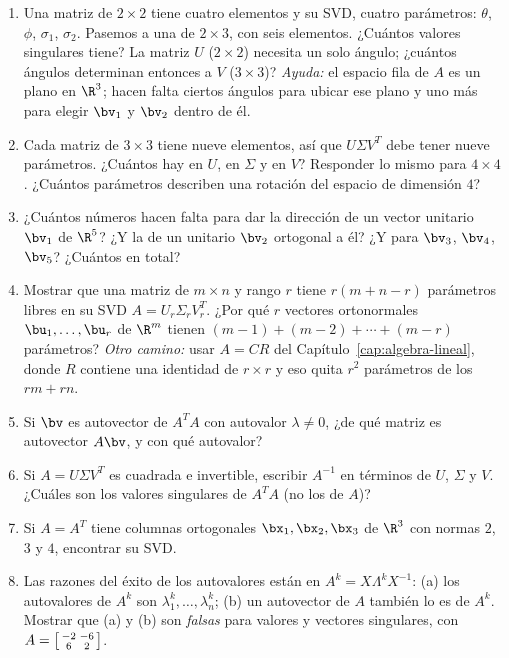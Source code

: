 \begin{enumerate}
\item\label{ej:parametros} Una matriz de $2\times2$ tiene cuatro elementos y
su SVD, cuatro parámetros: $\theta$, $\phi$, $\sigma_1$, $\sigma_2$. Pasemos
a una de $2\times3$, con seis elementos. ¿Cuántos valores singulares tiene?
La matriz $U$ ($2\times2$) necesita un solo ángulo; ¿cuántos ángulos
determinan entonces a $V$ ($3\times3$)? \emph{Ayuda:} el espacio fila de $A$
es un plano en $\R^3$; hacen falta ciertos ángulos para ubicar ese plano y
uno más para elegir $\bv_1$ y $\bv_2$ dentro de él.

\item Cada matriz de $3\times3$ tiene nueve elementos, así que
$U\Sigma V^T$ debe tener nueve parámetros. ¿Cuántos hay en $U$, en $\Sigma$ y
en $V$? Responder lo mismo para $4\times4$. ¿Cuántos parámetros describen una
rotación del espacio de dimensión $4$?

\item ¿Cuántos números hacen falta para dar la dirección de un vector
unitario $\bv_1$ de $\R^5$? ¿Y la de un unitario $\bv_2$ ortogonal a él? ¿Y
para $\bv_3$, $\bv_4$, $\bv_5$? ¿Cuántos en total?

\item Mostrar que una matriz de $m\times n$ y rango $r$ tiene
$r(m+n-r)$ parámetros libres en su SVD $A=U_r\Sigma_rV_r^T$. ¿Por qué $r$
vectores ortonormales $\bu_1,\dots,\bu_r$ de $\R^m$ tienen
$(m-1)+(m-2)+\cdots+(m-r)$ parámetros? \emph{Otro camino:} usar
$A=CR$ del Capítulo~\ref{cap:algebra-lineal}, donde $R$ contiene una
identidad de $r\times r$ y eso quita $r^2$ parámetros de los $rm+rn$.

\item Si $\bv$ es autovector de $A^TA$ con autovalor $\lambda\neq0$,
¿de qué matriz es autovector $A\bv$, y con qué autovalor?

\item Si $A=U\Sigma V^T$ es cuadrada e invertible, escribir $A^{-1}$ en
términos de $U$, $\Sigma$ y $V$. ¿Cuáles son los valores singulares de
$A^TA$ (no los de $A$)?

\item Si $A=A^T$ tiene columnas ortogonales $\bx_1,\bx_2,\bx_3$ de $\R^3$
con normas $2$, $3$ y $4$, encontrar su SVD.

\item Las razones del éxito de los autovalores están en
$A^k=X\Lambda^kX^{-1}$: (a) los autovalores de $A^k$ son $\lambda_1^k,\dots,
\lambda_n^k$; (b) un autovector de $A$ también lo es de $A^k$. Mostrar que
(a) y (b) son \emph{falsas} para valores y vectores singulares, con
$A=\begin{bsmallmatrix}-2&-6\\ 6&2\end{bsmallmatrix}$.

\end{enumerate}
